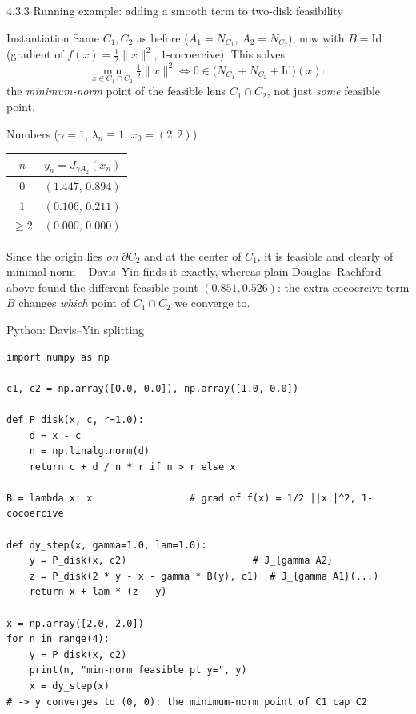 \documentclass[aspectratio=169,10pt]{beamer}
\newcommand{\Id}{\mathrm{Id}}
\begin{document}
\begin{frame}{4.3.3 Running example: adding a smooth term to two-disk feasibility}
  \begin{block}{Instantiation}
    Same $C_1,C_2$ as before ($A_1=N_{C_1}$, $A_2=N_{C_2}$), now with $B=\Id$ (gradient of $f(x)=\tfrac12\|x\|^2$, $1$-cocoercive). This solves
    \[
      \min_{x\in C_1\cap C_2} \tfrac12\|x\|^2 \iff 0\in \big(N_{C_1}+N_{C_2}+\Id\big)(x):
    \]
    the \emph{minimum-norm} point of the feasible lens $C_1\cap C_2$, not just \emph{some} feasible point.
  \end{block}
  \begin{block}{Numbers ($\gamma=1$, $\lambda_n\equiv1$, $x_0=(2,2)$)}
    \centering\small
    \begin{tabular}{c c}
      \toprule
      $n$ & $y_n=J_{\gamma A_2}(x_n)$ \\
      \midrule
      0 & $(1.447,\,0.894)$ \\
      1 & $(0.106,\,0.211)$ \\
      $\ge2$ & $(0.000,\,0.000)$ \\
      \bottomrule
    \end{tabular}
  \end{block}
  Since the origin lies \emph{on} $\partial C_2$ and at the center of $C_1$, it is feasible and clearly of minimal norm -- Davis--Yin finds it exactly, whereas plain Douglas--Rachford above found the different feasible point $(0.851,0.526)$: the extra cocoercive term $B$ changes \emph{which} point of $C_1\cap C_2$ we converge to.
\end{frame}

\begin{frame}[fragile]{Python: Davis--Yin splitting}
\begin{lstlisting}
import numpy as np

c1, c2 = np.array([0.0, 0.0]), np.array([1.0, 0.0])

def P_disk(x, c, r=1.0):
    d = x - c
    n = np.linalg.norm(d)
    return c + d / n * r if n > r else x

B = lambda x: x                 # grad of f(x) = 1/2 ||x||^2, 1-cocoercive

def dy_step(x, gamma=1.0, lam=1.0):
    y = P_disk(x, c2)                      # J_{gamma A2}
    z = P_disk(2 * y - x - gamma * B(y), c1)  # J_{gamma A1}(...)
    return x + lam * (z - y)

x = np.array([2.0, 2.0])
for n in range(4):
    y = P_disk(x, c2)
    print(n, "min-norm feasible pt y=", y)
    x = dy_step(x)
# -> y converges to (0, 0): the minimum-norm point of C1 cap C2
\end{lstlisting}
\end{frame}
\end{document}
